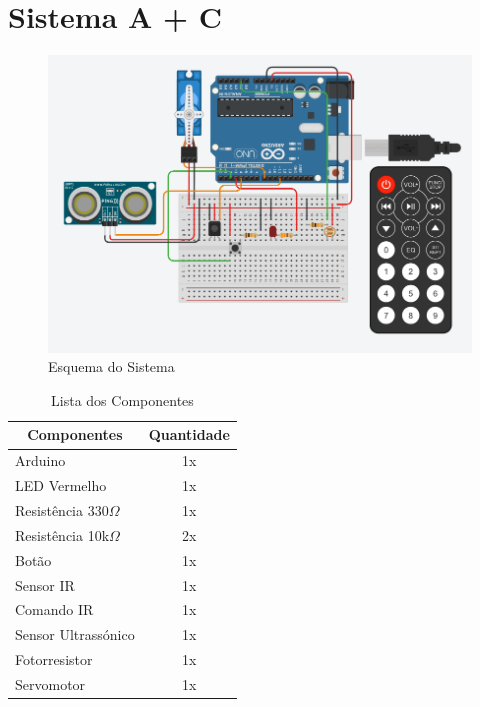 \newpage\section{Sistema A + C}

\begin{figure}[H]
    \centering
    \includegraphics[scale=0.45]{images/hardware/sisAC_tinkercadUltrassonic.png}
    \caption{Esquema do Sistema}
\end{figure}

\begin{table}[H]
    \centering
    \setlength{\arrayrulewidth}{0.5mm}
    \renewcommand{\arraystretch}{1.5}
    \begin{tabular}{|l|c|}
        \hline
        \multicolumn{1}{|c|}{Componentes} & \multicolumn{1}{|c|}{Quantidade}\\ [0.8ex] 
        \hline
        Arduino & 1x\\
        \hline
        LED Vermelho & 1x\\
        \hline
        Resistência 330$\Omega$ & 1x\\
        \hline
        Resistência 10k$\Omega$ & 2x\\
        \hline
        Botão & 1x\\
        \hline
        Sensor IR & 1x\\
        \hline
        Comando IR & 1x\\
        \hline
        Sensor Ultrassónico & 1x\\
        \hline
        Fotorresistor & 1x\\
        \hline
        Servomotor & 1x\\
        \hline
        
    \end{tabular}
    \caption{Lista dos Componentes}
\end{table}

